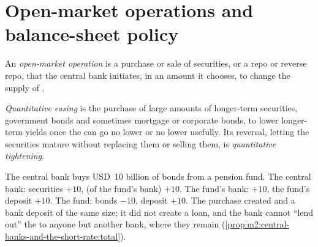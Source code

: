 \section{Open-market operations and balance-sheet policy}

\begin{definition}\label{def:m2:central-banks-and-the-short-rate:omo}
An \emph{open-market operation} is a purchase or
sale of securities, or a repo or reverse repo, that the central bank
initiates, in an amount it chooses, to change the supply of .
\end{definition}

\begin{definition}\label{def:m2:central-banks-and-the-short-rate:qe}
\emph{Quantitative easing} is the purchase of
large amounts of longer-term securities, government bonds and sometimes
mortgage or corporate bonds, to lower longer-term yields once the 
can go no lower or no lower usefully. Its reversal, letting the securities
mature without replacing them or selling them, is \emph{quantitative
tightening}.
\end{definition}

\begin{example}\label{ex:m2:central-banks-and-the-short-rate:purchase}
The central bank buys USD~10 billion of bonds from a pension fund. The
central bank: securities $+10$,  (of the fund's bank) $+10$. The
fund's bank:  $+10$, the fund's deposit $+10$. The fund: bonds
$-10$, deposit $+10$. The purchase created  and a bank deposit of
the same size; it did not create a loan, and the bank cannot ``lend out'' the
 to anyone but another bank, where they remain 
(\cref{prop:m2:central-banks-and-the-short-rate:total}).
\end{example}

